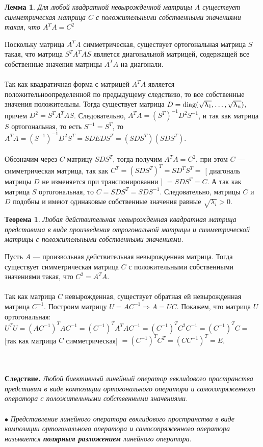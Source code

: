 \newtheorem*{lem14_8_2}{Лемма}\begin{lem14_8_2}Для любой квадратной невырожденной матрицы $A$ существует
	симметрическая матрица $C$ с положительными собственными значениями такая, что $A^TA=C^2$
\end{lem14_8_2}\begin{Proof}
	Поскольку матрица $A^TA$ симметрическая, существует ортогональная матрица $S$ такая, что матрица $S^TA^TAS$ является диагональной матрицей, содержащей все собственные значения матрицы $A^TA$ на диагонали.\\\\ Так как квадратичная форма с матрицей $A^TA$ является положительноопределенной по предыдущему следствию, то все собственные значения положительны. Тогда существует матрица $D = \operatorname{diag} (\sqrt{\uplambda_1},\dots,\sqrt{\uplambda_n})$, причем $D^2 = S^TA^TAS$. Следовательно, $A^TA = (S^T)^{-1}D^2S^{-1}$, и так как матрица $S$ ортогональная, то есть $S^{-1} = S^T$, то $A^TA = (S^{-1})^{-1}D^2S^T = SDEDS^T = (SDS^T)(SDS^T)$.\\\\ Обозначим через $C$ матрицу $SDS^T$, тогда получим $A^TA = C^2$, при этом $C$ --- симметрическая матрица, так как $C^T = (SDS^T)^T = SD^TS^T = $ [ диагональ матрицы $D$ не изменяется при транспонировании ] $ = SDS^T = C$. А так как матрица $S$ ортогональная, то $C = SDS^T = SDS^{-1}$. Следовательно, матрицы $C$ и $D$ подобны и имеют одинаковые собственные значения равные $\sqrt{\lambda_i}>0$.
\end{Proof}
\newtheorem*{th14_8}{Теорема}\begin{th14_8}Любая действительная невырожденная квадратная матрица представима в виде произведения отрогональной матрицы и симметрической матрицы с положительными собственными значениями.
\end{th14_8}\begin{Proof}
	Пусть $A$ --- произвольная действительная невырожденная матрица. Тогда существует симметрическая матрица $C$ с положительными собственными значениями такая, что $C^2 = A^TA$.\\\\
	Так как матрица $C$ невырожденная, существует обратная ей невырожденная матрица $C^{-1}$. Построим матрицу $U = AC^{-1}\Rightarrow A=UC$. Покажем, что матрица $U$ ортогональная: $U^TU = (AC^{-1})^TAC^{-1}=(C^{-1})^TA^TAC^{-1} = (C^{-1})^TC^2C^{-1} = (C^{-1})^TC = $ [так как матрица $C$ симметрическая] $ = (C^{-1})^TC^T = (CC^{-1})^T = E$.
\end{Proof}\\\\
\textbf{Следствие.} \textit{Любой биективный линейный оператор евклидового пространства представим в виде композиции ортогонального оператора и самосопряженного оператора с положительными собственными значениями.}\\\\
$\bullet$ \textit{Представление линейного оператора евклидового пространства в виде композиции ортогонального оператора и самосопряженного оператора называется \textbf{полярным разложением} линейного оператора}.





